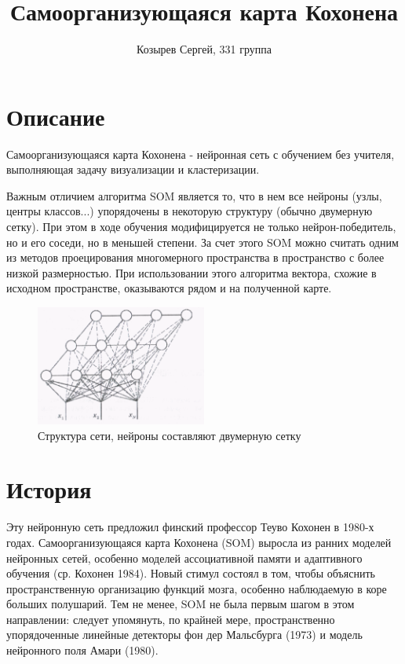 \documentclass[a4paper,12pt]{article}
\begin{document}
\title{Самоорганизующаяся карта Кохонена}
\author{Козырев Сергей, 331 группа}
\maketitle

\newpage
\tableofcontents

\newpage
\section{Описание}

Самоорганизующаяся карта Кохонена - нейронная сеть с обучением без учителя, выполняющая задачу визуализации и кластеризации.\cite{wikipedia_map_ru}

Важным отличием алгоритма SOM является то, что в нем все нейроны (узлы, центры классов...) упорядочены в некоторую структуру (обычно двумерную сетку). При этом в ходе обучения модифицируется не только нейрон-победитель, но и его соседи, но в меньшей степени. За счет этого SOM можно считать одним из методов проецирования многомерного пространства в пространство с более низкой размерностью. При использовании этого алгоритма вектора, схожие в исходном пространстве, оказываются рядом и на полученной карте.\cite{basegroup}

\begin{figure}[h]
  \centering
  \includegraphics[width=0.5\textwidth]{structure.png}
  \caption{Структура сети, нейроны составляют двумерную сетку}
\end{figure}

\section{История}

Эту нейронную сеть предложил финский профессор Теуво Кохонен в 1980-х годах. Самоорганизующаяся карта Кохонена (SOM) выросла из ранних моделей нейронных сетей, особенно моделей ассоциативной памяти и адаптивного обучения (ср. Кохонен 1984). Новый стимул состоял в том, чтобы объяснить пространственную организацию функций мозга, особенно наблюдаемую в коре больших полушарий. Тем не менее, SOM не была первым шагом в этом направлении: следует упомянуть, по крайней мере, пространственно упорядоченные линейные детекторы фон дер Мальсбурга (1973) и модель нейронного поля Амари (1980).
\end{document}
